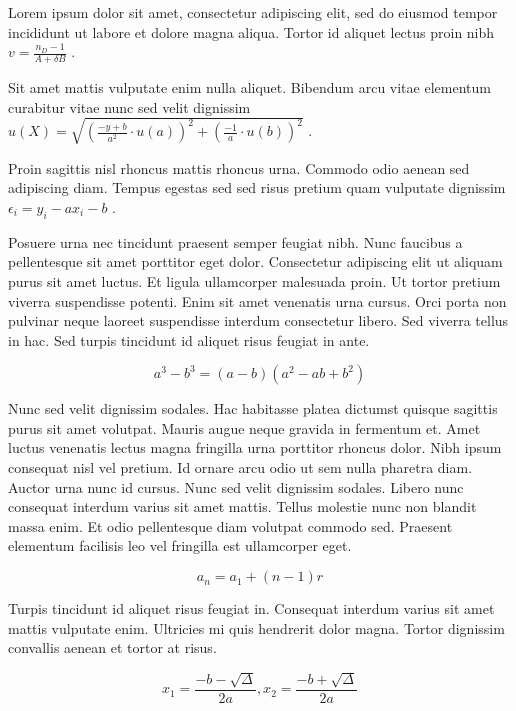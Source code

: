 \documentclass{article}
\begin{document}
	
    Lorem ipsum dolor sit amet, consectetur adipiscing elit, sed do eiusmod tempor incididunt ut labore et dolore magna aliqua. Tortor id aliquet lectus proin nibh 
    \begin{math}
    	v=\frac{n_D-1}{A+\delta B}
    \end{math}
    .
    \newline
    
    Sit amet mattis vulputate enim nulla aliquet. Bibendum arcu vitae elementum curabitur vitae nunc sed velit dignissim
     $ u(X)=\sqrt{(\frac{-y+b}{a^2}\cdot u(a))^2+(\frac{-1}{a}\cdot u(b))^2}  $
     .
    \newline
    
   Proin sagittis nisl rhoncus mattis rhoncus urna. Commodo odio aenean sed adipiscing diam. Tempus egestas sed sed risus pretium quam vulputate dignissim 
   \( \epsilon_i=y_i-ax_i-b \)
   .
   \newline
    
    Posuere urna nec tincidunt praesent semper feugiat nibh. Nunc faucibus a pellentesque sit amet porttitor eget dolor. Consectetur adipiscing elit ut aliquam purus sit amet luctus. Et ligula ullamcorper malesuada proin. Ut tortor pretium viverra suspendisse potenti. Enim sit amet venenatis urna cursus. Orci porta non pulvinar neque laoreet suspendisse interdum consectetur libero. Sed viverra tellus in hac. Sed turpis tincidunt id aliquet risus feugiat in ante.
    
    \[ a^3-b^3=(a-b)(a^2-ab+b^2)  \]
    
    Nunc sed velit dignissim sodales. Hac habitasse platea dictumst quisque sagittis purus sit amet volutpat. Mauris augue neque gravida in fermentum et. Amet luctus venenatis lectus magna fringilla urna porttitor rhoncus dolor. Nibh ipsum consequat nisl vel pretium. Id ornare arcu odio ut sem nulla pharetra diam. Auctor urna nunc id cursus. Nunc sed velit dignissim sodales. Libero nunc consequat interdum varius sit amet mattis. Tellus molestie nunc non blandit massa enim. Et odio pellentesque diam volutpat commodo sed. Praesent elementum facilisis leo vel fringilla est ullamcorper eget.
    
    $$ a_n=a_1+(n-1)r $$
    
    Turpis tincidunt id aliquet risus feugiat in. Consequat interdum varius sit amet mattis vulputate enim. Ultricies mi quis hendrerit dolor magna. Tortor dignissim convallis aenean et tortor at risus. 
    
    \begin{displaymath}
    	x_1=\frac{-b-\sqrt{\Delta}}{2a},x_2=\frac{-b+\sqrt{\Delta}}{2a}
    \end{displaymath}
    
\end{document}
